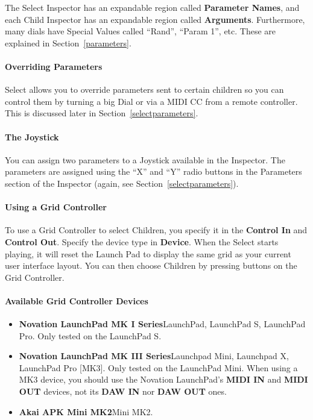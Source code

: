 \documentclass[twoside,10pt]{article}
\begin{document}
The Select Inspector has an expandable region called {\bf Parameter Names}, and each Child Inspector has an expandable region called {\bf Arguments}. Furthermore, many dials have Special Values called ``Rand'', ``Param 1'', etc.  These are explained in Section~\ref{parameters}.

\paragraph{Overriding Parameters}
Select allows you to override parameters sent to certain children so you can control them by turning a big Dial or via a MIDI CC from a remote controller.  This is discussed later in Section~\ref{selectparameters}.

\paragraph{The Joystick}
You can assign two parameters to a Joystick available in the Inspector.  The parameters are assigned using the ``X'' and ``Y'' radio buttons in the Parameters section of the Inspector (again, see Section~\ref{selectparameters}).

\paragraph{Using a Grid Controller}

To use a Grid Controller to select Children, you specify it in the {\bf Control In} and {\bf Control Out}.  Specify the device type in {\bf Device}.  When the Select starts playing, it will reset the Launch Pad to display the same grid as your current user interface layout.  You can then choose Children by pressing buttons on the Grid Controller.

\paragraph{Available Grid Controller Devices}

\begin{itemize}
\item {\bf Novation LaunchPad MK I Series}\qquad LaunchPad, LaunchPad S, LaunchPad Pro.  Only tested on the LaunchPad S.   
\item {\bf Novation LaunchPad MK III Series}\qquad Launchpad Mini, Launchpad X, LaunchPad Pro [MK3].  Only tested on the LaunchPad Mini.  When using a MK3 device, you should use the Novation LaunchPad's {\bf MIDI IN} and {\bf MIDI OUT} devices, not its {\bf DAW IN} nor {\bf DAW OUT} ones.  
\item {\bf Akai APK Mini MK2}\qquad Mini MK2.   

\end{itemize}
\end{document}
